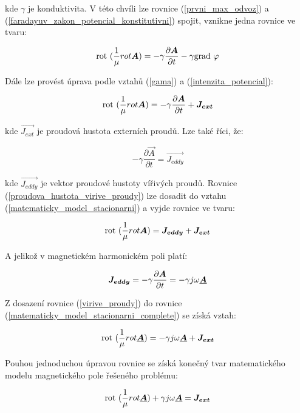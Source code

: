 kde $\gamma$ je konduktivita. V této chvíli lze rovnice (\ref{prvni_max_odvoz}) a (\ref{faradayuv_zakon_potencial_konstitutivni}) spojit, vznikne jedna rovnice ve tvaru:

\begin{equation}
	\mathrm{rot}\  (\frac{1}{\mu} {rot \mbox{\boldmath$A$}}) = - \gamma \frac{\partial \mbox{\boldmath$A$}}{\partial t} - \gamma \mathrm{grad}\ {\varphi}
	\label{matematicky_model_neupraveny}
\end{equation}

Dále lze provést úprava podle vztahů (\ref{gama}) a (\ref{intenzita_potencial}):

\begin{equation}
	\mathrm{rot}\  (\frac{1}{\mu} {rot \mbox{\boldmath$A$}}) = - \gamma \frac{\partial \mbox{\boldmath$A$}}{\partial t} + \mbox{\boldmath$J_{ext}$}
	\label{matematicky_model_stacionarni}
\end{equation}

kde $\vec{J_{ext}}$ je proudová hustota externích proudů. Lze také říci, že:

\begin{equation}
	- \gamma \frac{\partial \vec{A}}{\partial t} = \vec{J_{eddy}}
	\label{proudova_hustota_virive_proudy}
\end{equation}

kde $\vec{J_{eddy}}$ je vektor proudové hustoty vířivých proudů. Rovnice (\ref{proudova_hustota_virive_proudy}) lze dosadit do vztahu (\ref{matematicky_model_stacionarni}) a vyjde rovnice ve tvaru:

\begin{equation}
	\mathrm{rot}\  (\frac{1}{\mu} {rot \mbox{\boldmath$A$}}) = \mbox{\boldmath$J_{eddy}$} + \mbox{\boldmath$J_{ext}$}
	\label{matematicky_model_stacionarni_complete}
\end{equation}

A jelikož v magnetickém harmonickém poli platí:

\begin{equation}
	\mbox{\boldmath$J_{eddy}$} = - \gamma \frac{\partial \mbox{\boldmath$A$}}{\partial t} = - \gamma j \omega \mbox{\underline{\boldmath$A$}}
	\label{virive_proudy}
\end{equation}

Z dosazení rovnice (\ref{virive_proudy}) do rovnice (\ref{matematicky_model_stacionarni_complete}) se získá vztah:

\begin{equation}
	\mathrm{rot}\  (\frac{1}{\mu} {rot \mbox{\underline{\boldmath$A$}}}) = - \gamma j \omega \mbox{\underline{\boldmath$A$}} + \mbox{\boldmath$J_{ext}$}
\end{equation}

Pouhou jednoduchou úpravou rovnice se získá konečný tvar matematického modelu magnetického pole řešeného problému:

\begin{equation}
	\mathrm{rot}\  (\frac{1}{\mu} {rot \mbox{\underline{\boldmath$A$}}}) + \gamma j \omega \mbox{\underline{\boldmath$A$}} = \mbox{\boldmath$J_{ext}$}
	\label{matematicky_model_magneticke_pole}
\end{equation}